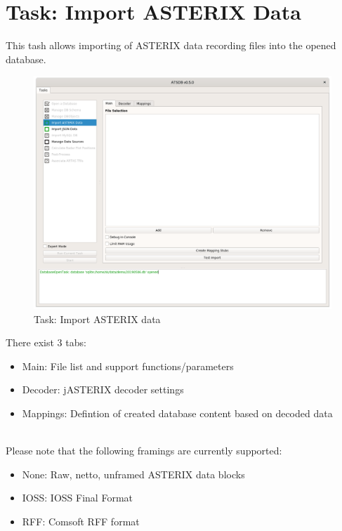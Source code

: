 \section{Task: Import ASTERIX Data}
\label{sec:task_import_asterix}

This tash allows importing of ASTERIX data recording files into the opened database. \\

\begin{figure}[H]
  \hspace*{-2.5cm}
    \includegraphics[width=19cm]{../screenshots/asterix_import_data.png}
  \caption{Task: Import ASTERIX data}
\end{figure}

There exist 3 tabs:

\begin{itemize}  
\item Main: File list and support functions/parameters
\item Decoder: jASTERIX decoder settings
\item Mappings: Defintion of created database content based on decoded data
\end{itemize}
\ \\

Please note that the following framings are currently supported:
\begin{itemize}  
\item None: Raw, netto, unframed ASTERIX data blocks
\item IOSS: IOSS Final Format
\item RFF: Comsoft RFF format
\end{itemize}
\ \\

